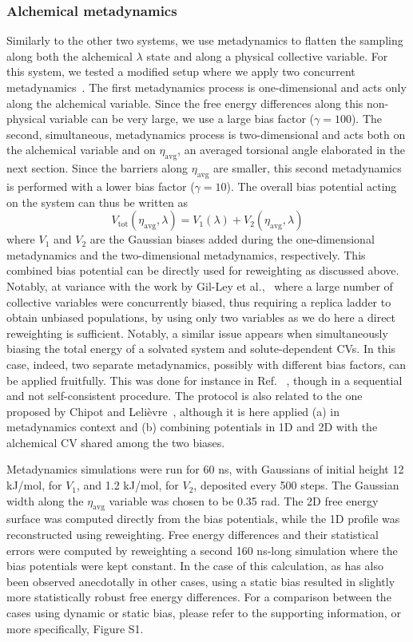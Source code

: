 \documentclass[journal=jacsat,manuscript=article]{achemso}
\begin{document}
\subsubsection{Alchemical metadynamics}
Similarly to the other two systems, we use metadynamics to flatten the sampling along both the alchemical $\lambda$ state and along a physical collective variable. For this system, we tested a modified setup where we apply two concurrent metadynamics~\cite{gil2015enhanced}. The first metadynamics process is one-dimensional and acts only along the alchemical variable. Since the free energy differences along this non-physical variable can be very large, we use a large bias factor ($\gamma=100$). The second, simultaneous, metadynamics process is two-dimensional and acts both on the alchemical variable and on $\eta_{\text{avg}}$, an averaged torsional angle elaborated in the next section. Since the barriers along $\eta_{\text{avg}}$ are smaller, this second metadynamics is performed with a lower bias factor ($\gamma=10$). The overall bias potential acting on the system can thus be written as
\begin{equation}
    V_{\text{tot}}(\eta_{\text{avg}},\lambda) = V_1(\lambda) + V_2(\eta_{\text{avg}},\lambda)
\end{equation}
where $V_1$ and $V_2$ are the Gaussian biases added during the one-dimensional metadynamics and the two-dimensional metadynamics, respectively. This combined bias potential can be directly used for reweighting as discussed above. Notably, at variance with the work by Gil-Ley et al.,~\cite{gil2015enhanced} where a large number of collective variables were concurrently biased, thus requiring a replica ladder to obtain unbiased populations, by using only two variables as we do here a direct reweighting is sufficient. Notably, a similar issue appears when simultaneously biasing the total energy of a solvated system and solute-dependent CVs. In this case, indeed, two separate metadynamics, possibly with different bias factors, can be applied fruitfully. This was done for instance in Ref. ~\cite{deighan2012efficient}, though in a sequential and not self-consistent procedure.  The protocol is also related to the one proposed by Chipot and Leli\`evre~\cite{chipot2011enhanced}, although it is here applied (a) in metadynamics context and (b) combining potentials in 1D and 2D with the alchemical CV shared among the two biases.

Metadynamics simulations were run for 60 ns, with Gaussians of initial height 12 kJ/mol, for $V_1$, and 1.2 kJ/mol, for $V_2$, deposited every 500 steps. The Gaussian width along the $\eta_{\text{avg}}$ variable was chosen to be 0.35 rad. The 2D free energy surface was computed directly from the bias potentials, while the 1D profile was reconstructed using reweighting. Free energy differences and their statistical errors were computed by reweighting a second 160 ns-long simulation where the bias potentials were kept constant. In the case of this calculation, as has also been observed anecdotally in other cases, using a static bias resulted in slightly more statistically robust free energy differences. For a comparison between the cases using dynamic or static bias, please refer to the supporting information, or more specifically, Figure S1.
\end{document}
